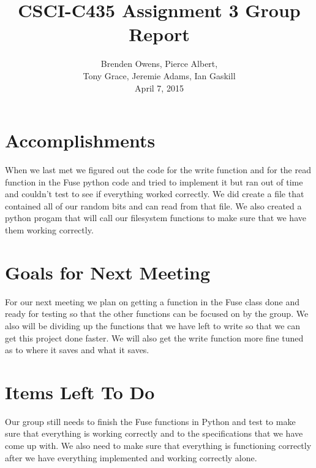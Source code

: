\documentclass[12pt, letterpaper, notitlepage]{paper}
\title{CSCI-C435 Assignment 3 Group Report}
\author{Brenden Owens, Pierce Albert, \\
Tony Grace, Jeremie Adams, Ian Gaskill
\\April 7, 2015}
\begin{document}
\maketitle

\section{Accomplishments}
When we last met we figured out the code for the write function and for the read function in the Fuse python code and tried to implement it but ran out of time and couldn't test to see if everything worked correctly. We did create a file that contained all of our random bits and can read from that file. We also created a python progam that will call our filesystem functions to make sure that we have them working correctly. 
\section{Goals for Next Meeting}
For our next meeting we plan on getting a function in the Fuse class done and ready for testing so that the other functions can be focused on by the group. We also will be dividing up the functions that we have left to write so that we can get this project done faster. We will also get the write function more fine tuned as to where it saves and what it saves. 
\section{Items Left To Do}
Our group still needs to finish the Fuse functions in Python and test to make sure that everything is working correctly and to the specifications that we have come up with. We also need to make sure that everything is functioning correctly after we have everything implemented and working correctly alone. 
\end{document}
